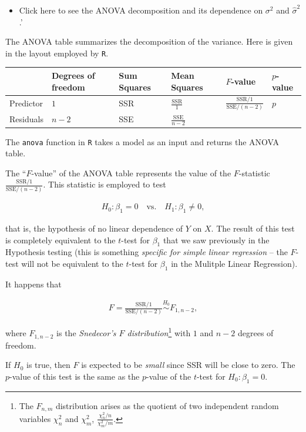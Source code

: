 \documentclass[]{book}
\let\rmarkdownfootnote\footnote%
\def\footnote{\protect\rmarkdownfootnote}
\newenvironment{rmdblock}[1]
  {\begin{shaded*}
  \begin{itemize}
  \renewcommand{\labelitemi}{
    \raisebox{-.7\height}[0pt][0pt]{
      {\setkeys{Gin}{width=2em,keepaspectratio}\texttt{[image: img/icons/\#1]}}
    }
  }
  \item
  }
  {
  \end{itemize}
  \end{shaded*}
  }
\newenvironment{rmdinsight}
  {\begin{rmdblock}{insight}}
  {\end{rmdblock}}
\begin{document}
\begin{rmdinsight}
Click here to see the ANOVA decomposition and its dependence on
\(\sigma^2\) and \(\hat\sigma^2\).'
\end{rmdinsight}

The ANOVA table summarizes the decomposition of the variance. Here is
given in the layout employed by \texttt{R}.

\begin{longtable}[c]{@{}llllll@{}}
\toprule
& Degrees of freedom & Sum Squares & Mean Squares & \(F\)-value &
\(p\)-value\tabularnewline
\midrule
\endhead
Predictor & \(1\) & SSR & \(\frac{\text{SSR}}{1}\) &
\(\frac{\text{SSR}/1}{\text{SSE}/(n-2)}\) & \(p\)\tabularnewline
Residuals & \(n - 2\) & SSE & \(\frac{\text{SSE}}{n-2}\) &
&\tabularnewline
\bottomrule
\end{longtable}

The \texttt{anova} function in \texttt{R} takes a model as an input and
returns the ANOVA table.

The ``\(F\)-value'' of the ANOVA table represents the value of the
\(F\)-statistic \(\frac{\text{SSR}/1}{\text{SSE}/(n-2)}\). This
statistic is employed to test

\begin{align*}
H_0:\beta_1=0\quad\text{vs.}\quad H_1:\beta_1\neq 0,
\end{align*}

that is, the hypothesis of no linear dependence of \(Y\) on \(X\). The
result of this test is completely equivalent to the \(t\)-test for
\(\beta_1\) that we saw previously in the Hypothesis testing (this is
something \emph{specific for simple linear regression} -- the \(F\)-test
will not be equivalent to the \(t\)-test for \(\beta_1\) in the Mulitple
Linear Regression).

It happens that

\begin{align*}
F=\frac{\text{SSR}/1}{\text{SSE}/(n-2)}\stackrel{H_0}{\sim} F_{1,n-2},
\end{align*}

where \(F_{1,n-2}\) is the \emph{Snedecor's \(F\)
distribution}\footnote{The \(F_{n,m}\) distribution arises as the
  quotient of two independent random variables \(\chi^2_n\) and
  \(\chi^2_m\), \(\frac{\chi^2_n/n}{\chi^2_m/m}\).} with \(1\) and
\(n-2\) degrees of freedom.

If \(H_0\) is true, then \(F\) is expected to be \emph{small} since SSR
will be close to zero. The \(p\)-value of this test is the same as the
\(p\)-value of the \(t\)-test for \(H_0:\beta_1=0\).
\end{document}
